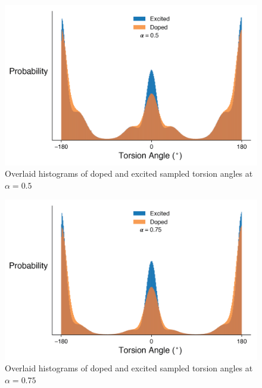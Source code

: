 \begin{figure}[hbt!]
    \centering
    \includegraphics{figures/append_tor_model/a_050_hist.png}
    \caption{Overlaid histograms of doped and excited sampled torsion angles at $\alpha = 0.5$}
    \label{fig:a_050_hist}
\end{figure}

\begin{figure}[hbt!]
    \centering
    \includegraphics{figures/append_tor_model/a_075_hist.png}
    \caption{Overlaid histograms of doped and excited sampled torsion angles at $\alpha = 0.75$}
    \label{fig:a_075_hist}
\end{figure}

